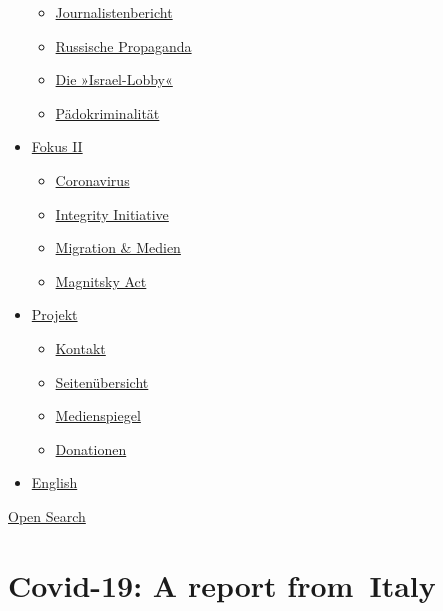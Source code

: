\begin{itemize}
  \begin{itemize}
  \tightlist
  \item
    \href{https://swprs.org/bericht-eines-journalisten/}{Journalistenbericht}
  \item
    \href{https://swprs.org/russische-propaganda/}{Russische Propaganda}
  \item
    \href{https://swprs.org/die-israel-lobby-fakten-und-mythen/}{Die
    »Israel-Lobby«}
  \item
    \href{https://swprs.org/geopolitik-und-paedokriminalitaet/}{Pädokriminalität}
  \end{itemize}
\item
  \href{https://swprs.org/migration-und-medien/}{Fokus II}

  \begin{itemize}
  \tightlist
  \item
    \href{https://swprs.org/covid-19-hinweis-ii/}{Coronavirus}
  \item
    \href{https://swprs.org/die-integrity-initiative/}{Integrity
    Initiative}
  \item
    \href{https://swprs.org/migration-und-medien/}{Migration \& Medien}
  \item
    \href{https://swprs.org/der-fall-magnitsky/}{Magnitsky Act}
  \end{itemize}
\item
  \href{https://swprs.org/kontakt/}{Projekt}

  \begin{itemize}
  \tightlist
  \item
    \href{https://swprs.org/kontakt/}{Kontakt}
  \item
    \href{https://swprs.org/uebersicht/}{Seitenübersicht}
  \item
    \href{https://swprs.org/medienspiegel/}{Medienspiegel}
  \item
    \href{https://swprs.org/donationen/}{Donationen}
  \end{itemize}
\item
  \href{https://swprs.org/contact/}{English}
\end{itemize}

\protect\hyperlink{}{Open Search}

\hypertarget{covid-19-a-report-from-italy}{%
\section{Covid-19: A report
from~Italy}\label{covid-19-a-report-from-italy}}


